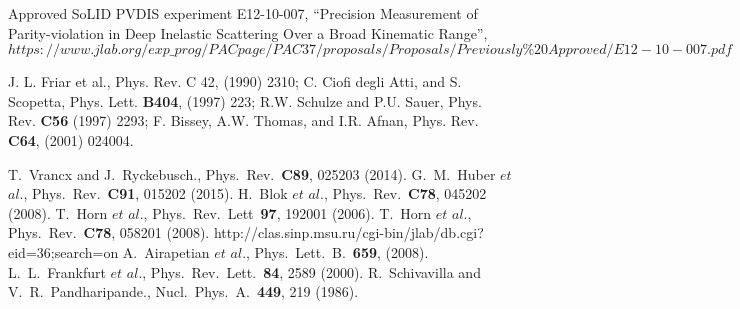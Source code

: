 \begin{thebibliography}{}
  Approved SoLID PVDIS experiment E12-10-007,
  ``Precision Measurement of Parity-violation in Deep Inelastic Scattering Over
  a Broad Kinematic Range'',
  $https://www.jlab.org/exp\_prog/PACpage/PAC37/proposals/Proposals/Previously\%20Approved/E12-10-007.pdf$

J. L. Friar et al., Phys. Rev. C 42, (1990) 2310; C. Ciofi
degli Atti, and S. Scopetta, Phys. Lett. {\bf B404}, (1997) 223; R.W. Schulze
and P.U. Sauer, Phys. Rev. {\bf C56} (1997) 2293; F. Bissey, A.W. Thomas, and
I.R. Afnan, Phys. Rev. {\bf C64}, (2001) 024004.

	        T.~Vrancx and J.~Ryckebusch., Phys.~Rev.~\textbf{C89}, 025203 (2014).
	G.~M.~Huber $\textit{et}$ $\textit{al}$., Phys.~Rev.~\textbf{C91}, 015202 (2015).
	H.~Blok $\textit{et}$ $\textit{al}$., Phys.~Rev.~\textbf{C78}, 045202 (2008).
	T.~Horn $\textit{et}$ $\textit{al}$., Phys.~Rev.~Lett~\textbf{97}, 192001 (2006).
	T.~Horn $\textit{et}$ $\textit{al}$., Phys.~Rev.~\textbf{C78}, 058201 (2008).
	        http://clas.sinp.msu.ru/cgi-bin/jlab/db.cgi?eid=36;search=on
	A.~Airapetian $\textit{et}$ $\textit{al}$., Phys.~Lett.~B.~\textbf{659}, (2008).
	L.~L.~Frankfurt $\textit{et}$ $\textit{al}$., Phys.~Rev.~Lett.~\textbf{84}, 2589 (2000).
    R.~Schivavilla and V.~R.~Pandharipande.,  Nucl.~Phys.~A.~\textbf{449}, 219 (1986).



\end{thebibliography}

